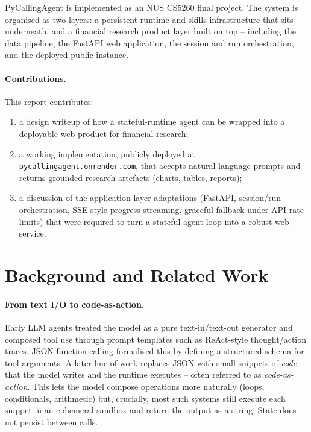 \documentclass[11pt,a4paper]{article}
\begin{document}
PyCallingAgent is implemented as an NUS CS5260 final project. The system is organised as two layers: a persistent-runtime and skills infrastructure that sits underneath, and a financial research product layer built on top -- including the data pipeline, the FastAPI web application, the session and run orchestration, and the deployed public instance.

\paragraph{Contributions.} This report contributes:
\begin{enumerate}[leftmargin=1.3em,itemsep=0.2em]
    \item a design writeup of how a stateful-runtime agent can be wrapped into a deployable web product for financial research;
    \item a working implementation, publicly deployed at \href{https://pycallingagent.onrender.com}{\texttt{pycallingagent.onrender.com}}, that accepts natural-language prompts and returns grounded research artefacts (charts, tables, reports);
    \item a discussion of the application-layer adaptations (FastAPI, session/run orchestration, SSE-style progress streaming, graceful fallback under API rate limits) that were required to turn a stateful agent loop into a robust web service.
\end{enumerate}

\section{Background and Related Work}

\paragraph{From text I/O to code-as-action.}
Early LLM agents treated the model as a pure text-in/text-out generator and composed tool use through prompt templates such as ReAct-style thought/action traces. JSON function calling formalised this by defining a structured schema for tool arguments. A later line of work replaces JSON with small snippets of \emph{code} that the model writes and the runtime executes -- often referred to as \emph{code-as-action}. This lets the model compose operations more naturally (loops, conditionals, arithmetic) but, crucially, most such systems still execute each snippet in an ephemeral sandbox and return the output as a string. State does not persist between calls.
\end{document}
